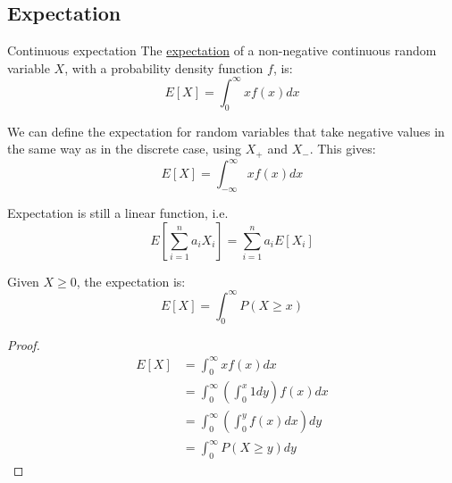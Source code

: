 \documentclass[../Main.tex]{subfiles}
\begin{document}
\subsection{Expectation}
\begin{definition}{Continuous expectation}
    The \underline{expectation} of a non-negative continuous random variable $X$, with a probability density function $f$, is:
    \begin{equation*}
        E[X] = \int_0^\infty xf(x) dx
    \end{equation*}
\end{definition}
\begin{remarks}
    \item We can define the expectation for random variables that take negative values in the same way as in the discrete case, using $X_+$ and $X_-$. This gives:
        \begin{equation*}
            E[X] = \int_{-\infty}^\infty xf(x) dx
        \end{equation*}
    \item Expectation is still a linear function, i.e.
        \begin{equation*}
            E\left[\sum_{i = 1}^n a_i X_i\right] = \sum_{i = 1}^n a_i E[X_i]
        \end{equation*}
\end{remarks}
\begin{lemma}
    Given $X \geq 0$, the expectation is:
    \begin{equation*}
        E[X] = \int_0^\infty P(X \geq x)
    \end{equation*}
\end{lemma}
\begin{proof}
    \begin{align*}
        E[X] &= \int_0^\infty x f(x) dx \\
        &= \int_0^\infty \left(\int_0^x 1 dy\right)f(x) dx \\
        &= \int_0^\infty \left(\int_0^y f(x) dx\right) dy \\
        &= \int_0^\infty P(X \geq y) dy
    \end{align*}
\end{proof}
\end{document}
